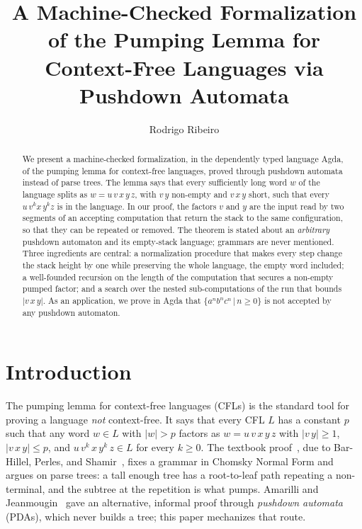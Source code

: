 \documentclass[runningheads]{llncs}
\begin{document}
%
\title{A Machine-Checked Formalization of the Pumping
Lemma for Context-Free Languages via Pushdown Automata}
%
%
\author{Rodrigo Ribeiro}
%
%
%
\maketitle
%
\begin{abstract}
  We present a machine-checked formalization, in the dependently typed language
  Agda, of the pumping lemma for context-free languages, proved through pushdown
  automata instead of parse trees. The lemma says that every sufficiently long
  word $w$ of the language splits as $w = u\,v\,x\,y\,z$, with $v\,y$ non-empty
  and $v\,x\,y$ short, such that every $u\,v^{k}x\,y^{k}z$ is in the language.
  In our proof, the factors $v$ and $y$ are the input read by two segments of an
  accepting computation that return the stack to the same configuration, so that
  they can be repeated or removed. The theorem is stated about an
  \emph{arbitrary} pushdown automaton and its empty-stack language; grammars are
  never mentioned. Three ingredients are central: a normalization procedure that
  makes every step change the stack height by one while preserving the whole
  language, the empty word included; a well-founded recursion on the length of
  the computation that secures a non-empty pumped factor; and a search over the
  nested sub-computations of the run that bounds $|v\,x\,y|$. As an application,
  we prove in Agda that $\{a^{n}b^{n}c^{n}\,|\,n\geq 0\}$ is not accepted by any pushdown
  automaton.

\end{abstract}
%
\section{Introduction}\label{sec:intro}

The pumping lemma for context-free languages (CFLs) is the standard tool for
proving a language \emph{not} context-free. It says that every CFL $L$ has a
constant $p$ such that any word $w \in L$ with $|w| > p$ factors as
$w = u\,v\,x\,y\,z$ with $|v\,y| \geq 1$, $|v\,x\,y| \leq p$, and
$u\,v^{k}\,x\,y^{k}\,z \in L$ for every $k \geq 0$. The textbook
proof~\cite{hopcroft06,sipser13}, due to Bar-Hillel, Perles, and
Shamir~\cite{BarHillel61}, fixes a grammar in Chomsky Normal Form and argues on
parse trees: a tall enough tree has a root-to-leaf path repeating a
non-terminal, and the subtree at the repetition is what pumps. Amarilli and
Jeanmougin~\cite{Amarilli12} gave an alternative, informal proof through
\emph{pushdown automata} (PDAs), which never builds a tree; this paper
mechanizes that route.
\end{document}
